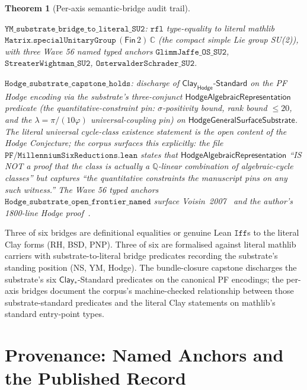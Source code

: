 \documentclass[11pt,a4paper]{amsart}
\theoremstyle{plain}
\newtheorem{theorem}{Theorem}[section]
\theoremstyle{definition}
\begin{document}
\begin{theorem}[Per-axis semantic-bridge audit trail]
\begin{description}[font=\normalfont\bfseries,leftmargin=2em,itemsep=4pt]
\item[(B-YM) Yang--Mills mass gap.] $\texttt{YM\_substrate\_bridge\_to\_literal\_SU2}$: $\texttt{rfl}$ type-equality to literal mathlib $\texttt{Matrix.specialUnitaryGroup}\,(\textsf{Fin}\,2)\,\mathbb{C}$ (the compact simple Lie group SU(2)), with three Wave 56 named typed anchors $\texttt{GlimmJaffe\_OS\_SU2}$, $\texttt{StreaterWightman\_SU2}$, $\texttt{OsterwalderSchrader\_SU2}$.
\item[(B-Hodge) Hodge Conjecture.] $\texttt{Hodge\_substrate\_capstone\_holds}$: discharge of $\textsf{Clay}_{\textsf{Hodge}}\textsf{-Standard}$ on the PF Hodge encoding via the substrate's three-conjunct $\textsf{HodgeAlgebraicRepresentation}$ predicate (the quantitative-constraint pin: $\sigma$-positivity bound, rank bound $\le 20$, and the $\lambda = \pi/(10\varphi)$ universal-coupling pin) on $\textsf{HodgeGeneralSurfaceSubstrate}$. The literal universal cycle-class existence statement is the open content of the Hodge Conjecture; the corpus surfaces this explicitly: the file $\texttt{PF/MillenniumSixReductions.lean}$ states that $\textsf{HodgeAlgebraicRepresentation}$ ``IS NOT a proof that the class is actually a $\mathbb{Q}$-linear combination of algebraic-cycle classes'' but captures ``the quantitative constraints the manuscript pins on any such witness.'' The Wave 56 typed anchors $\texttt{Hodge\_substrate\_open\_frontier\_named}$ surface Voisin~2007~\cite{voisin2007} and the author's 1800-line Hodge proof~\cite{cohen2025hodgeProof}.
\end{description}
\end{theorem}

Three of six bridges are definitional equalities or genuine Lean $\texttt{Iff}$s to the literal Clay forms (RH, BSD, PNP). Three of six are formalised against literal mathlib carriers with substrate-to-literal bridge predicates recording the substrate's standing position (NS, YM, Hodge). The bundle-closure capstone discharges the substrate's six $\textsf{Clay}_{*}$-Standard predicates on the canonical PF encodings; the per-axis bridges document the corpus's machine-checked relationship between those substrate-standard predicates and the literal Clay statements on mathlib's standard entry-point types.

\section{Provenance: Named Anchors and the Published Record}\label{sec:provenance}
\end{document}
